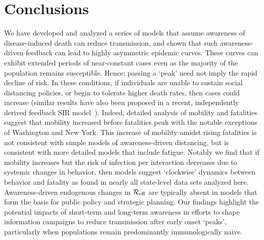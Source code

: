 \section{Conclusions}
We have developed and analyzed
a series of models that assume awareness of disease-induced death can 
reduce transmission, and shown that such awareness-driven feedback
can lead
to highly asymmetric epidemic curves.  These
curves can exhibit extended periods of near-constant
cases even as the majority of the population remains susceptible.
Hence: passing a `peak' need not imply
the rapid decline of risk.  
In these conditions, if individuals are unable
to sustain social
distancing policies, or begin to tolerate higher death rates, then cases 
could increase (similar results have also been proposed in a recent, independently derived feedback SIR model~\citep{franco2020feedback}). 
Indeed, detailed analysis of mobility and fatalities suggest
that mobility increased before fatalities peak with the notable
exceptions of Washington and New York.
This increase of mobility amidst rising fatalities is not consistent with simple models of awareness-driven distancing, but is consistent with more detailed models that include fatigue.
Notably we find that if mobility increases but the risk of infection per interaction decreases due to systemic changes in behavior, then models suggest `clockwise' dynamics between behavior and fatality as found in nearly all state-level data sets analyzed here.
Awareness-driven endogenous changes in ${\cal{R}}_{\mathrm{eff}}$ are typically
absent in models that form the basis for public policy and strategic planning.
Our findings highlight the potential impacts of short-term and long-term awareness in efforts to shape information campaigns to reduce transmission after early onset `peaks', particularly when populations remain predominantly immunologically naive.

